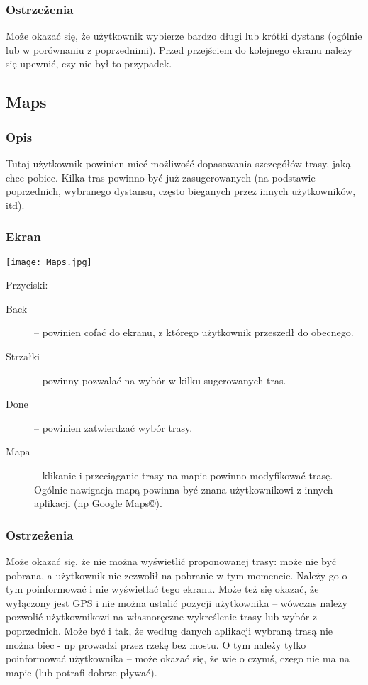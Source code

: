 \subsubsection{Ostrzeżenia}
\noindent Może okazać się, że użytkownik wybierze bardzo długi lub krótki dystans (ogólnie lub w porównaniu z poprzednimi). Przed przejściem do kolejnego ekranu należy się upewnić, czy nie był to przypadek.
\subsection{Maps}
\subsubsection{Opis}
\noindent Tutaj użytkownik powinien mieć możliwość dopasowania szczegółów trasy, jaką chce pobiec. Kilka tras powinno być już zasugerowanych (na podstawie poprzednich, wybranego dystansu, często bieganych przez innych użytkowników, itd).
\subsubsection{Ekran}
\begin{minipage}{0.5\textwidth}
  \texttt{[image: Maps.jpg]}
  \label{M}
\end{minipage}
\begin{minipage}{0.5\textwidth}
Przyciski:\\
\begin{description}
  \item[Back] -- powinien cofać do ekranu, z którego użytkownik przeszedł do obecnego.
  \item[Strzałki] -- powinny pozwalać na wybór w kilku sugerowanych tras.
  \item[Done] -- powinien zatwierdzać wybór trasy.
  \item[Mapa] -- klikanie i przeciąganie trasy na mapie powinno modyfikować trasę. Ogólnie nawigacja mapą powinna być znana użytkownikowi z innych aplikacji (np Google Maps©).
\end{description}
\end{minipage}
\subsubsection{Ostrzeżenia}
\noindent Może okazać się, że nie można wyświetlić proponowanej trasy: może nie być pobrana, a użytkownik nie zezwolił na pobranie w tym momencie. Należy go o tym poinformować i nie wyświetlać tego ekranu. Może też się okazać, że wyłączony jest GPS i nie można ustalić pozycji użytkownika -- wówczas należy pozwolić użytkownikowi na własnoręczne wykreślenie trasy lub wybór z poprzednich. Może być i tak, że według danych aplikacji wybraną trasą nie można biec - np prowadzi przez rzekę bez mostu. O tym należy tylko poinformować użytkownika -- może okazać się, że wie o czymś, czego nie ma na mapie (lub potrafi dobrze pływać).
